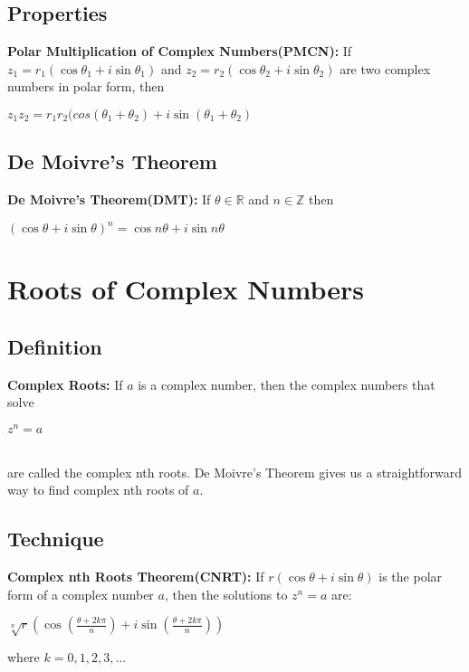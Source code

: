 \documentclass[12pt]{report}
\begin{document}
		\subsection{Properties}
			\textbf{Polar Multiplication of Complex Numbers(PMCN):} If $z_1 = r_1(\cos \theta_1 + i \sin \theta_1)$ and $z_2 = r_2(\cos \theta_2 + i \sin \theta_2)$ are two complex numbers in polar form, then \\
			\centerline{$z_1z_2 = r_1r_2(cos(\theta_1 + \theta_2) + i \sin (\theta_1 + \theta_2)$}
		\subsection{De Moivre's Theorem}
			\textbf{De Moivre's Theorem(DMT):} If $\theta \in \mathbb{R}$ and $n \in \mathbb{Z}$ then \\
			\centerline{$(\cos \theta + i \sin \theta)^n = \cos n\theta + i \sin n\theta$}				
	\section{Roots of Complex Numbers}
		\subsection{Definition}
			\textbf{Complex Roots: }If $a$ is a complex number, then the complex numbers that solve \\
			\centerline{$z^n = a$} \\
			are called the complex nth roots. De Moivre's Theorem gives us a straightforward way to find complex nth roots of $a$.
		\subsection{Technique}
			\textbf{Complex nth Roots Theorem(CNRT):} If $r(\cos \theta + i \sin \theta)$ is the polar form of a complex number $a$, then the solutions to $z^n = a$ are:\\
			\centerline{$\sqrt[n]{r}(\cos (\frac{\theta + 2k\pi}{n}) + i \sin (\frac{\theta + 2k\pi}{n}))$}
			where $k = 0,1,2,3,...$
			
\end{document}
